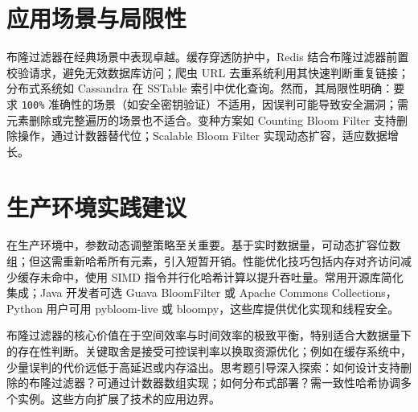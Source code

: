 \chapter{应用场景与局限性}
布隆过滤器在经典场景中表现卓越。缓存穿透防护中，Redis 结合布隆过滤器前置校验请求，避免无效数据库访问；爬虫 URL 去重系统利用其快速判断重复链接；分布式系统如 Cassandra 在 SSTable 索引中优化查询。然而，其局限性明确：要求 \verb!100%! 准确性的场景（如安全密钥验证）不适用，因误判可能导致安全漏洞；需元素删除或完整遍历的场景也不适合。变种方案如 Counting Bloom Filter 支持删除操作，通过计数器替代位；Scalable Bloom Filter 实现动态扩容，适应数据增长。\par
\chapter{生产环境实践建议}
在生产环境中，参数动态调整策略至关重要。基于实时数据量，可动态扩容位数组；但这需重新哈希所有元素，引入短暂开销。性能优化技巧包括内存对齐访问减少缓存未命中，使用 SIMD 指令并行化哈希计算以提升吞吐量。常用开源库简化集成；Java 开发者可选 Guava BloomFilter 或 Apache Commons Collections，Python 用户可用 pybloom-live 或 bloompy，这些库提供优化实现和线程安全。\par
布隆过滤器的核心价值在于空间效率与时间效率的极致平衡，特别适合大数据量下的存在性判断。关键取舍是接受可控误判率以换取资源优化；例如在缓存系统中，少量误判的代价远低于高延迟或内存溢出。思考题引导深入探索：如何设计支持删除的布隆过滤器？可通过计数器数组实现；如何分布式部署？需一致性哈希协调多个实例。这些方向扩展了技术的应用边界。\par
